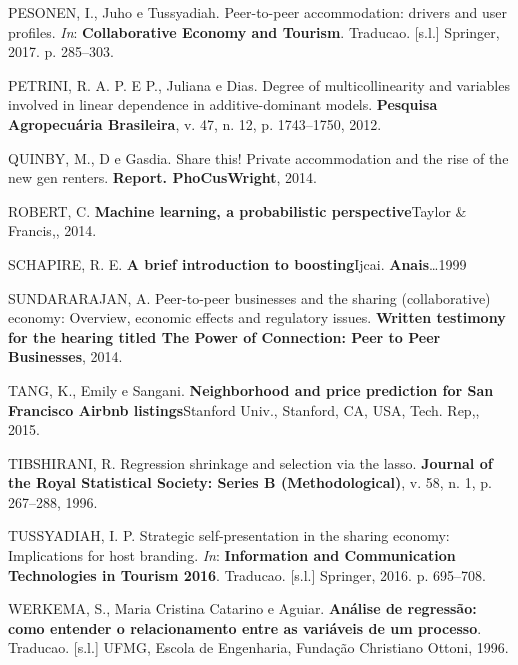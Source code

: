 \documentclass[
	12pt,				%
	a4paper,		%
	oneside,    %
	chapter=TITLE,		   %
	section=TITLE,		   %
	subsection=TITLE,	   %
	subsubsection=TITLE, %
	english,			%
	french,				%
	spanish,			%
	brazil,				%
]{abntex2}
\begin{document}
\leavevmode\hypertarget{ref-pesonen2017peer}{}%
PESONEN, I., Juho e Tussyadiah. Peer-to-peer accommodation: drivers and
user profiles. \emph{In}: \textbf{Collaborative Economy and Tourism}.
Traducao. {[}s.l.{]} Springer, 2017. p. 285--303.

\leavevmode\hypertarget{ref-petrini2012degree}{}%
PETRINI, R. A. P. E P., Juliana e Dias. Degree of multicollinearity and
variables involved in linear dependence in additive-dominant models.
\textbf{Pesquisa Agropecuária Brasileira}, v. 47, n. 12, p. 1743--1750,
2012.

\leavevmode\hypertarget{ref-quinby2014share}{}%
QUINBY, M., D e Gasdia. Share this! Private accommodation and the rise
of the new gen renters. \textbf{Report. PhoCusWright}, 2014.

\leavevmode\hypertarget{ref-robert2014machine}{}%
ROBERT, C. \textbf{Machine learning, a probabilistic perspective}Taylor
\& Francis,, 2014.

\leavevmode\hypertarget{ref-schapire1999brief}{}%
SCHAPIRE, R. E. \textbf{A brief introduction to boosting}Ijcai.
\textbf{Anais}\ldots1999

\leavevmode\hypertarget{ref-sundararajan2014peer}{}%
SUNDARARAJAN, A. Peer-to-peer businesses and the sharing (collaborative)
economy: Overview, economic effects and regulatory issues.
\textbf{Written testimony for the hearing titled The Power of
Connection: Peer to Peer Businesses}, 2014.

\leavevmode\hypertarget{ref-tang2015neighborhood}{}%
TANG, K., Emily e Sangani. \textbf{Neighborhood and price prediction for
San Francisco Airbnb listings}Stanford Univ., Stanford, CA, USA, Tech.
Rep,, 2015.

\leavevmode\hypertarget{ref-tibshirani1996regression}{}%
TIBSHIRANI, R. Regression shrinkage and selection via the lasso.
\textbf{Journal of the Royal Statistical Society: Series B
(Methodological)}, v. 58, n. 1, p. 267--288, 1996.

\leavevmode\hypertarget{ref-tussyadiah2016strategic}{}%
TUSSYADIAH, I. P. Strategic self-presentation in the sharing economy:
Implications for host branding. \emph{In}: \textbf{Information and
Communication Technologies in Tourism 2016}. Traducao. {[}s.l.{]}
Springer, 2016. p. 695--708.

\leavevmode\hypertarget{ref-werkema1996analise}{}%
WERKEMA, S., Maria Cristina Catarino e Aguiar. \textbf{Análise de
regressão: como entender o relacionamento entre as variáveis de um
processo}. Traducao. {[}s.l.{]} UFMG, Escola de Engenharia, Fundação
Christiano Ottoni, 1996.
\end{document}
